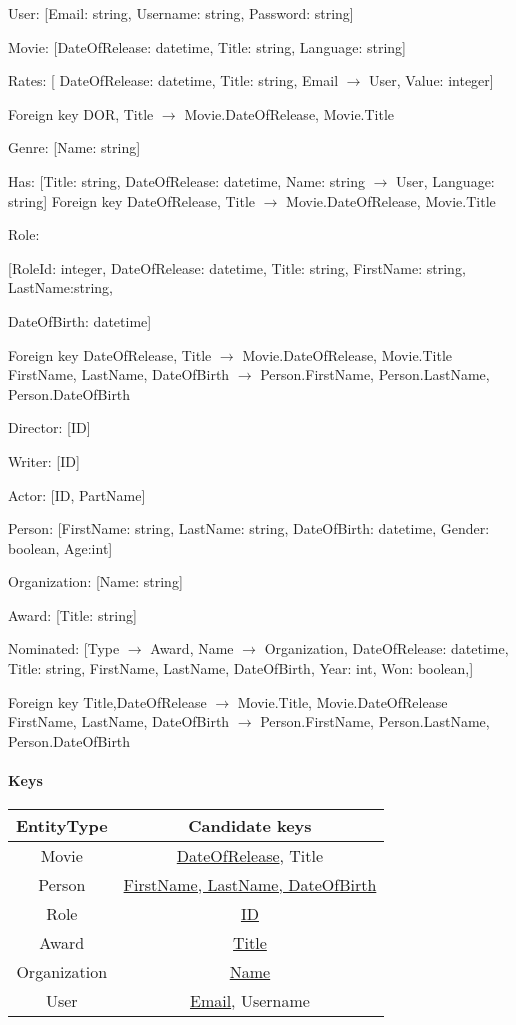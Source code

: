 User: {[Email: string, Username: string, Password: string]}

Movie: {[DateOfRelease: datetime, Title: string, Language: string]}

Rates: {[ DateOfRelease: datetime, Title: string, Email $ \rightarrow $ User, Value: integer]}

Foreign key {DOR, Title}  $ \rightarrow $ {Movie.DateOfRelease, Movie.Title}

Genre: {[Name: string]}

Has: {[Title: string, DateOfRelease: datetime, Name: string $ \rightarrow $ User, Language: string]}
	Foreign key {DateOfRelease, Title} $ \rightarrow $ {Movie.DateOfRelease, Movie.Title}

Role: {[RoleId: integer, DateOfRelease: datetime, Title: string, FirstName: string, LastName:string,

DateOfBirth: datetime]}

Foreign key {DateOfRelease, Title} $ \rightarrow $ {Movie.DateOfRelease, Movie.Title}
	{FirstName, LastName, DateOfBirth} $ \rightarrow $ {Person.FirstName, Person.LastName, 
Person.DateOfBirth}

Director: {[ID]}

Writer: {[ID]}

Actor: {[ID, PartName]}

Person: {[FirstName: string, LastName: string, DateOfBirth: datetime, 
Gender: boolean, Age:int]}

Organization: {[Name: string]}

Award: {[Title: string]}

Nominated: {[Type $ \rightarrow $ Award, Name $ \rightarrow $ Organization, DateOfRelease: datetime, Title: string, FirstName, LastName, DateOfBirth, Year: int, Won: boolean,]}

Foreign key {Title,DateOfRelease} $ \rightarrow $ {Movie.Title, Movie.DateOfRelease}
		{FirstName, LastName, DateOfBirth} $ \rightarrow $ {Person.FirstName, Person.LastName, 
Person.DateOfBirth}

\paragraph{Keys}

\begin{tabular}{| c | c |}
\hline
EntityType & Candidate keys\\
\hline 
\hline
Movie & \underline{DateOfRelease}, Title\\
\hline
Person & \underline{FirstName, LastName, DateOfBirth}\\
\hline
Role & \underline{ID}\\
\hline
\hline 
Award & \underline{Title}\\
\hline
Organization & \underline{Name}\\
\hline
User & \underline{Email}, Username\\
\hline
\end{tabular}

